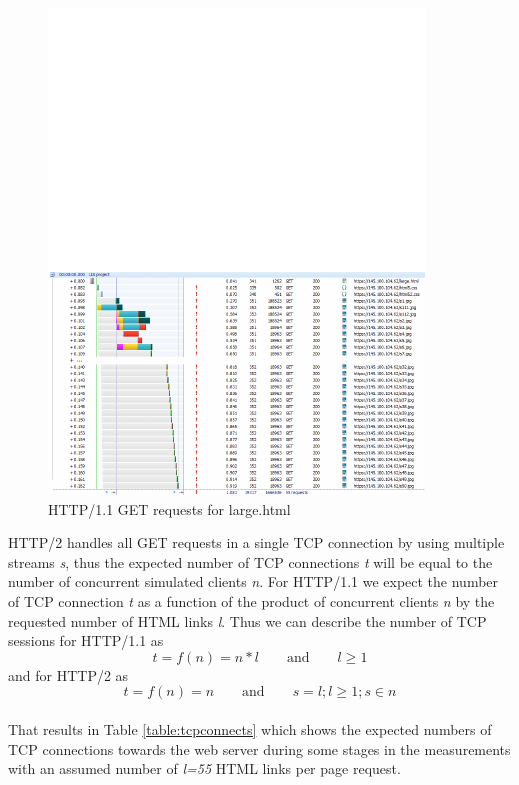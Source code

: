 \begin{figure}[H]
	\centering
	\includegraphics[scale=2,trim=0.0cm .0cm .0cm 4.5cm,clip]{images/http.pdf}
	\caption{HTTP/1.1 GET requests for large.html}
	\label{fig:httpwatch}
\end{figure}


HTTP/2 handles all GET requests in a single TCP connection by using multiple streams \textit{s}, thus the expected number of TCP connections \textit{t} will be equal to the number of concurrent simulated clients \textit{n}. For HTTP/1.1  we expect the number of TCP connection \textit{t} as a function of the product of concurrent clients \textit{n} by the requested number of HTML links \textit{l}. Thus we can describe the number of TCP sessions for HTTP/1.1 as \begin{equation}
t=f(n)=n*l \qquad \text{and} \qquad l \geq 1\end{equation} and for HTTP/2 as \begin{equation} t=f(n)=n \qquad \text{and} \qquad s=l; l\geq 1; s \in n \end{equation}
\\
That results in Table \ref{table:tcpconnects} which shows the expected numbers of TCP connections towards the web server during some stages in the measurements with an assumed number of \textit{l=55} HTML links per page request.

